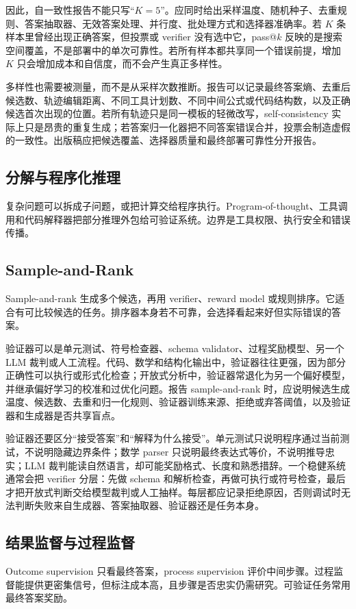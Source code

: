 \documentclass[UTF8,zihao=-4,openany]{ctexbook}
\begin{document}
因此，自一致性报告不能只写“$K=5$”。应同时给出采样温度、随机种子、去重规则、答案抽取器、无效答案处理、并行度、批处理方式和选择器准确率。若 $K$ 条样本里曾经出现正确答案，但投票或 verifier 没有选中它，pass@$k$ 反映的是搜索空间覆盖，不是部署中的单次可靠性。若所有样本都共享同一个错误前提，增加 $K$ 只会增加成本和自信度，而不会产生真正多样性。

多样性也需要被测量，而不是从采样次数推断。报告可以记录最终答案熵、去重后候选数、轨迹编辑距离、不同工具计划数、不同中间公式或代码结构数，以及正确候选首次出现的位置。若所有轨迹只是同一模板的轻微改写，self-consistency 实际上只是昂贵的重复生成；若答案归一化器把不同答案错误合并，投票会制造虚假的一致性。出版稿应把候选覆盖、选择器质量和最终部署可靠性分开报告。

\subsection{分解与程序化推理}
复杂问题可以拆成子问题，或把计算交给程序执行。Program-of-thought、工具调用和代码解释器把部分推理外包给可验证系统。边界是工具权限、执行安全和错误传播。

\subsection{Sample-and-Rank}
Sample-and-rank 生成多个候选，再用 verifier、reward model 或规则排序。它适合有可比较候选的任务。排序器本身若不可靠，会选择看起来好但实际错误的答案。

验证器可以是单元测试、符号检查器、schema validator、过程奖励模型、另一个 LLM 裁判或人工流程。代码、数学和结构化输出中，验证器往往更强，因为部分正确性可以执行或形式化检查；开放式分析中，验证器常退化为另一个偏好模型，并继承偏好学习的校准和过优化问题。报告 sample-and-rank 时，应说明候选生成温度、候选数、去重和归一化规则、验证器训练来源、拒绝或弃答阈值，以及验证器和生成器是否共享盲点。

验证器还要区分“接受答案”和“解释为什么接受”。单元测试只说明程序通过当前测试，不说明隐藏边界条件；数学 parser 只说明最终表达式等价，不说明推导忠实；LLM 裁判能读自然语言，却可能奖励格式、长度和熟悉措辞。一个稳健系统通常会把 verifier 分层：先做 schema 和解析检查，再做可执行或符号检查，最后才把开放式判断交给模型裁判或人工抽样。每层都应记录拒绝原因，否则调试时无法判断失败来自生成器、答案抽取器、验证器还是任务本身。

\subsection{结果监督与过程监督}
Outcome supervision 只看最终答案，process supervision 评价中间步骤。过程监督能提供更密集信号，但标注成本高，且步骤是否忠实仍需研究。可验证任务常用最终答案奖励。
\end{document}
